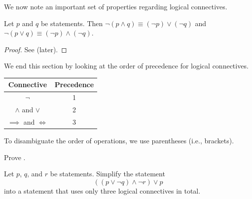 We now note an important set of properties regarding logical connectives.

\begin{proposition}\label{prop:de-morgan}
    Let $p$ and $q$ be statements. Then $\lnot (p \land q) \equiv (\lnot p) \lor (\lnot q)$ and $\lnot (p \lor q) \equiv (\lnot p) \land (\lnot q)$.
\end{proposition}
\begin{proof}
    See  (later).
\end{proof}

We end this section by looking at the order of precedence for logical connectives.
\begin{table}[H]
    \centering
    \begin{tabular}{|c|c|}
        \hline
        \textbf{Connective} & \textbf{Precedence} \\ \hline
        $\lnot$ & 1 \\ \hline
        $\land$ and $\lor$ & 2 \\ \hline
        $\implies$ and $\iff$ & 3 \\ \hline
    \end{tabular}
\end{table}
To disambiguate the order of operations, we use parentheses (i.e., brackets).

\begin{exercise}\label{exercise:de-morgan}
    Prove .
\end{exercise}

\begin{exercise}
    Let $p$, $q$, and $r$ be statements. Simplify the statement
    \[
        ((p \lor \lnot q) \land \lnot r) \lor p
    \]
    into a statement that uses only three logical connectives in total.
\end{exercise}

